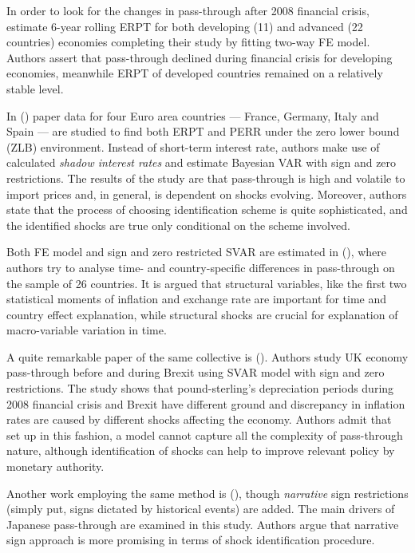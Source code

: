 \documentclass[12pt, a4paper]{extarticle}
\begin{document}
In order to look for the changes in pass-through after 2008 financial crisis, \textcite{Jasova2016} estimate 6-year rolling ERPT for both developing (11) and advanced (22 countries) economies completing their study by fitting two-way FE model. Authors assert that pass-through declined during financial crisis for developing economies, meanwhile ERPT of developed countries remained on a relatively stable level.

In (\cite{Comunale2017}) paper data for four Euro area countries --- France, Germany, Italy and Spain --- are studied to find both ERPT and PERR under the zero lower bound (ZLB) environment. Instead of short-term interest rate, authors make use of calculated \textit{shadow interest rates} and estimate Bayesian VAR with sign and zero restrictions. The results of the study are that pass-through is high and volatile to import prices and, in general, is dependent on shocks evolving. Moreover, authors state that the process of choosing identification scheme is quite sophisticated, and the identified shocks are true only conditional on the scheme involved.

Both FE model and sign and zero restricted SVAR are estimated in (\cite{Forbes2017}), where authors try to analyse time- and country-specific differences in pass-through on the sample of 26 countries. It is argued that structural variables, like the first two statistical moments of inflation and exchange rate are important for time and country effect explanation, while structural shocks are crucial for explanation of macro-variable variation in time.

A quite remarkable paper of the same collective is (\cite{Forbes2018}). Authors study UK economy pass-through before and during Brexit using SVAR model with sign and zero restrictions. The study shows that pound-sterling's depreciation periods during 2008 financial crisis and Brexit have different ground and discrepancy in inflation rates are caused by different shocks affecting the economy. Authors admit that set up in this fashion, a model cannot capture all the complexity of pass-through nature, although identification of shocks can help to improve relevant policy by monetary authority.

Another work employing the same method is (\cite{An2020}), though \textit{narrative} sign restrictions (simply put, signs dictated by historical events) are added. The main drivers of Japanese pass-through are examined in this study. Authors argue that narrative sign approach is more promising in terms of shock identification procedure.
\end{document}
